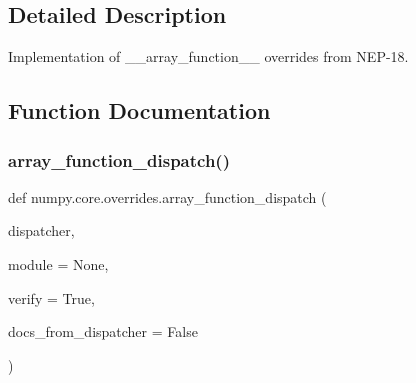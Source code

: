 \subsection{Detailed Description}
\begin{DoxyVerb}Implementation of __array_function__ overrides from NEP-18.\end{DoxyVerb}
 

\subsection{Function Documentation}
\mbox{\label{namespacenumpy_1_1core_1_1overrides_a1f1970e59f9a4e93ebdc06fcaaa3bb72}} 
\subsubsection{\texorpdfstring{array\+\_\+function\+\_\+dispatch()}{array\_function\_dispatch()}}
{\footnotesize\ttfamily def numpy.\+core.\+overrides.\+array\+\_\+function\+\_\+dispatch (\begin{DoxyParamCaption}\item[{}]{dispatcher,  }\item[{}]{module = {\ttfamily None},  }\item[{}]{verify = {\ttfamily True},  }\item[{}]{docs\+\_\+from\+\_\+dispatcher = {\ttfamily False} }\end{DoxyParamCaption})}

